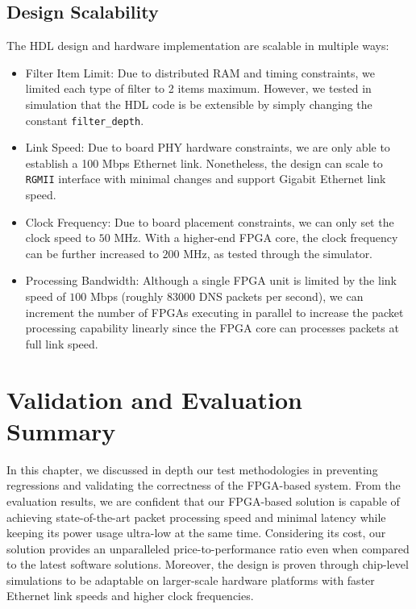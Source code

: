 \documentclass[a4paper]{report}
\newcommand{\code}{\texttt}
\begin{document}
\subsection{Design Scalability}

The HDL design and hardware implementation are scalable in multiple ways:

\begin{itemize}
    \item Filter Item Limit: Due to distributed RAM and timing constraints, we limited each type of filter to 2 items maximum. However, we tested in simulation that the HDL code is be extensible by simply changing the constant \code{filter\_depth}.
    \item Link Speed: Due to board PHY hardware constraints, we are only able to establish a 100 Mbps Ethernet link. Nonetheless, the design can scale to \code{RGMII} interface with minimal changes and support Gigabit Ethernet link speed.
    \item Clock Frequency: Due to board placement constraints, we can only set the clock speed to $50$ MHz. With a higher-end FPGA core, the clock frequency can be further increased to $200$ MHz, as tested through the simulator.
    \item Processing Bandwidth: Although a single FPGA unit is limited by the link speed of $100$ Mbps (roughly $83000$ DNS packets per second), we can increment the number of FPGAs executing in parallel to increase the packet processing capability linearly since the FPGA core can processes packets at full link speed.
\end{itemize}

\section{Validation and Evaluation Summary}

In this chapter, we discussed in depth our test methodologies in preventing regressions and validating the correctness of the FPGA-based system. From the evaluation results, we are confident that our FPGA-based solution is capable of achieving state-of-the-art packet processing speed and minimal latency while keeping its power usage ultra-low at the same time. Considering its cost, our solution provides an unparalleled price-to-performance ratio even when compared to the latest software solutions. Moreover, the design is proven through chip-level simulations to be adaptable on larger-scale hardware platforms with faster Ethernet link speeds and higher clock frequencies.
\end{document}
